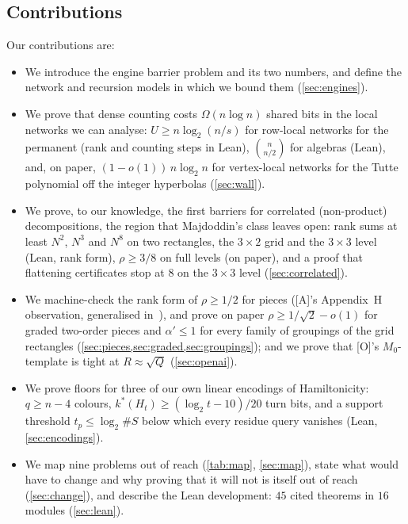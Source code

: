 \documentclass[10pt]{amsart}
\theoremstyle{plain}
\theoremstyle{definition}
\theoremstyle{remark}
\numberwithin{equation}{section}
\newcommand{\A}{\textup{[A]}}
\newcommand{\Oa}{\textup{[O]}}
\begin{document}
\subsection{Contributions}
Our contributions are:
\begin{itemize}
\item We introduce the engine barrier problem and its two numbers, and define the network and
recursion models in which we bound them (\cref{sec:engines}).
\item We prove that dense counting costs $\Omega(n\log n)$ shared bits in the local networks we can
analyse: $U\ge n\log_2(n/s)$ for row-local networks for the permanent (rank and counting steps in
Lean), $\binom n{n/2}$ for algebras (Lean), and, on paper, $(1-o(1))\,n\log_2 n$ for vertex-local
networks for the Tutte polynomial off the integer hyperbolas (\cref{sec:wall}).
\item We prove, to our knowledge, the first barriers for correlated (non-product) decompositions,
the region that Majdoddin's class leaves open: rank sums at least $N^2$, $N^3$ and $N^8$ on two
rectangles, the $3\times2$ grid and the $3\times3$ level (Lean, rank form), $\rho\ge3/8$ on full levels
(on paper), and a proof that flattening certificates stop at $8$ on the $3\times3$ level
(\cref{sec:correlated}).
\item We machine-check the rank form of $\rho\ge1/2$ for pieces (\A's Appendix~H observation,
generalised in~\cite{Maj26}), and prove on paper $\rho\ge1/\sqrt2-o(1)$ for graded two-order pieces
and $\alpha'\le1$ for every family of groupings of the grid rectangles
(\cref{sec:pieces,sec:graded,sec:groupings}); and we prove that \Oa's $M_0$-template is tight at
$R\approx\sqrt Q$ (\cref{sec:openai}).
\item We prove floors for three of our own linear encodings of Hamiltonicity: $q\ge n-4$ colours,
$k^*(H_t)\ge(\log_2t-10)/20$ turn bits, and a support threshold $t_p\le\log_2\#S$ below which
every residue query vanishes (Lean, \cref{sec:encodings}).
\item We map nine problems out of reach (\cref{tab:map}, \cref{sec:map}), state what would have to
change and why proving that it will not is itself out of reach (\cref{sec:change}), and describe the
Lean development: $45$ cited theorems in $16$ modules (\cref{sec:lean}).
\end{itemize}
\end{document}
